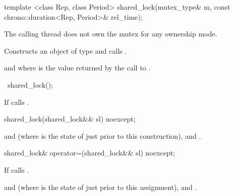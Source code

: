 %
\begin{itemdecl}
template <class Rep, class Period>
  shared_lock(mutex_type& m,
              const chrono::duration<Rep, Period>& rel_time);
\end{itemdecl}

\begin{itemdescr}
\pnum
\requires The calling thread does not own the mutex for any ownership mode.

\pnum
\effects Constructs an object of type  and calls
.

\pnum
\postconditions {} and  where  is
the value returned by the call to .
\end{itemdescr}

%
\begin{itemdecl}
~shared_lock();
\end{itemdecl}

\begin{itemdescr}
\pnum
\effects If  calls .
\end{itemdescr}

%
\begin{itemdecl}
shared_lock(shared_lock&& sl) noexcept;
\end{itemdecl}

\begin{itemdescr}
\pnum
\postconditions {} and  (where
 is the state of  just prior to this construction),
 and .
\end{itemdescr}

%
\begin{itemdecl}
shared_lock& operator=(shared_lock&& sl) noexcept;
\end{itemdecl}

\begin{itemdescr}
\pnum
\effects If  calls .

\pnum
\postconditions {} and  (where
 is the state of  just prior to this assignment),
 and .
\end{itemdescr}

